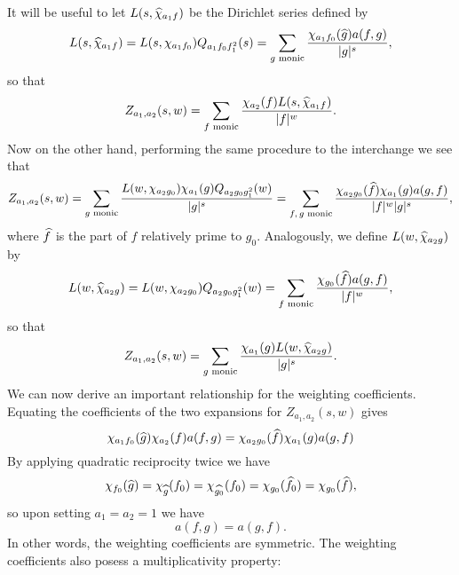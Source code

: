 \documentclass[12pt,reqno,oneside]{amsart}
\begin{document}
    It will be useful to let $L(s,\widehat{\chi}_{a_{1}f})$ be the Dirichlet series defined by
    \[
        L(s,\widehat{\chi}_{a_{1}f}) = L(s,\chi_{a_{1}f_{0}})Q_{a_{1}f_{0}f_{1}^{2}}(s) = \sum_{\text{$g$ monic}}\frac{\chi_{a_{1}f_{0}}(\widehat{g})a(f,g)}{|g|^{s}},
    \]
    so that
    \[
        Z_{a_{1},a_{2}}(s,w) = \sum_{\text{$f$ monic}}\frac{\chi_{a_{2}}(f)L(s,\widehat{\chi}_{a_{1}f})}{|f|^{w}}.
    \]
     Now on the other hand, performing the same procedure to the interchange we see that
    \[
        Z_{a_{1},a_{2}}(s,w) = \sum_{\text{$g$ monic}}\frac{L(w,\chi_{a_{2}g_{0}})\chi_{a_{1}}(g)Q_{a_{2}g_{0}g_{1}^{2}}(w)}{|g|^{s}} = \sum_{\text{$f,g$ monic}}\frac{\chi_{a_{2}g_{0}}(\widehat{f})\chi_{a_{1}}(g)a(g,f)}{|f|^{w}|g|^{s}},
    \]
    where $\widehat{f}$ is the part of $f$ relatively prime to $g_{0}$. Analogously, we define $L(w,\widehat{\chi}_{a_{2}g})$ by
    \[
        L(w,\widehat{\chi}_{a_{2}g}) = L(w,\chi_{a_{2}g_{0}})Q_{a_{2}g_{0}g_{1}^{2}}(w) = \sum_{\text{$f$ monic}}\frac{\chi_{g_{0}}(\widehat{f})a(g,f)}{|f|^{w}},
    \]
    so that
    \[
        Z_{a_{1},a_{2}}(s,w) = \sum_{\text{$g$ monic}}\frac{\chi_{a_{1}}(g)L(w,\widehat{\chi}_{a_{2}g})}{|g|^{s}}.
    \]
    We can now derive an important relationship for the weighting coefficients. Equating the coefficients of the two expansions for $Z_{a_{1},a_{2}}(s,w)$ gives
    \[
        \chi_{a_{1}f_{0}}(\widehat{g})\chi_{a_{2}}(f)a(f,g) = \chi_{a_{2}g_{0}}(\widehat{f})\chi_{a_{1}}(g)a(g,f)
    \]
    By applying quadratic reciprocity twice we have
    \[
        \chi_{f_{0}}(\widehat{g}) = \chi_{\widehat{g}}(f_{0}) = \chi_{\widehat{g_{0}}}(f_{0}) = \chi_{g_{0}}(\widehat{f_{0}}) = \chi_{g_{0}}(\widehat{f}),
    \]
    so upon setting $a_{1} = a_{2} = 1$ we have
    \[
        a(f,g) = a(g,f).
    \]
    In other words, the weighting coefficients are symmetric. The weighting coefficients also posess a multiplicativity property:
\end{document}
